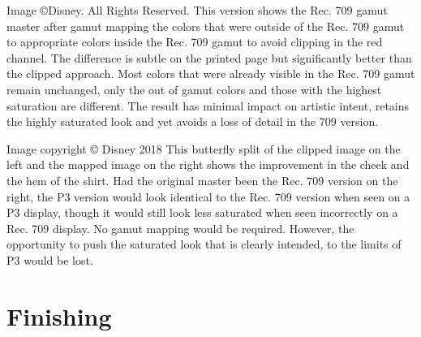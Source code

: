 Image ©Disney. All Rights Reserved.
This version shows the Rec. 709 gamut master after gamut mapping the colors that were outside of the Rec. 709 gamut to appropriate colors inside the Rec. 709 gamut to avoid clipping in the red channel. The difference is subtle on the printed page but significantly better than the clipped approach. Most colors that were already visible in the Rec. 709 gamut remain unchanged, only the out of gamut colors and those with the highest saturation are different. The result has minimal impact on artistic intent, retains the highly saturated look and yet avoids a loss of detail in the 709 version. 


Image copyright © Disney 2018
This butterfly split of the clipped image on the left and the mapped image on the right shows the improvement in the cheek and the hem of the shirt. Had the original master been the Rec. 709 version on the right, the P3 version would look identical to the Rec. 709 version when seen on a P3 display, though it would still look less saturated when seen incorrectly on a Rec. 709 display. No gamut mapping would be required. However, the opportunity to push the saturated look that is clearly intended, to the limits of P3 would be lost.

\section{Finishing}


